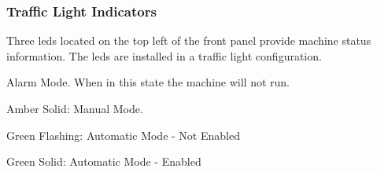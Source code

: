     \subsubsection{Traffic Light Indicators}
        Three \acrshort{led}s located on the top left of the front panel provide machine status information. The \acrshort{led}s are installed in a traffic light configuration. 

        \begin{description}
            \item[Red Solid:] Alarm Mode. When in this state the machine will not run. 
            \item Amber Solid: Manual Mode.
            \item Green Flashing: Automatic Mode - Not Enabled
            \item Green Solid: Automatic Mode - Enabled
        \end{description}
        
    
    
